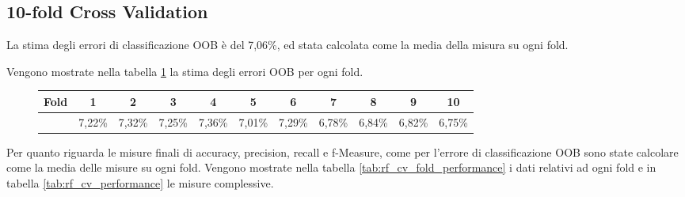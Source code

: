 \subsection{10-fold Cross Validation}
La stima degli errori di classificazione OOB è del 7,06\%, ed stata calcolata 
come la media della misura su ogni fold.

Vengono mostrate nella tabella \ref{tab:rf_cv_OOB} la stima degli errori OOB 
per ogni fold.

\begin{figure}[H]
	\centering
	\begin{tabular}{lcccccccccc}
		\toprule
		Fold & \textbf{1} & \textbf{2} & \textbf{3} & \textbf{4} & 
		\textbf{5} & \textbf{6} & \textbf{7} & \textbf{8} & 
		\textbf{9} & \textbf{10} \\
		\midrule
		&7,22\% & 7,32\% & 7,25\% & 7,36\% & 7,01\% & 7,29\% & 6,78\% & 6,84\% 
		& 6,82\% & 6,75\%  	\\ 
		\bottomrule
	\end{tabular}
	\label{tab:rf_cv_OOB}
\end{figure}

Per quanto riguarda le misure finali di accuracy, precision, recall e 
f-Measure, come per l'errore di classificazione OOB sono state calcolare come 
la media delle misure su ogni fold. 
Vengono mostrate nella tabella \ref{tab:rf_cv_fold_performance} i dati relativi 
ad ogni fold e in tabella \ref{tab:rf_cv_performance} le misure complessive.

